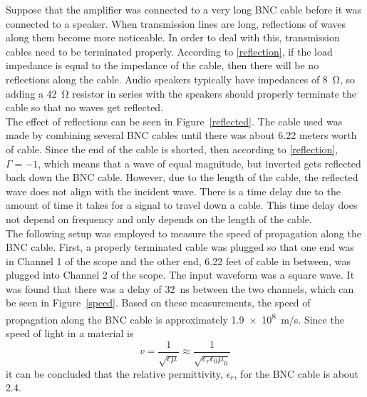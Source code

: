 \documentclass[11pt,letterpaper]{article}
\begin{document}
Suppose that the amplifier was connected to a very long BNC cable before it was
connected to a speaker. When transmission lines are long, reflections of waves
along them become more noticeable. In order to deal with this, transmission
cables need to be terminated properly. According to \eqref{reflection}, if the
load impedance is equal to the impedance of the cable, then there will be no
reflections along the cable. Audio speakers typically have impedances of 
\SI{8}{\ohm}, so adding a \SI{42}{\ohm} resistor in series with the speakers
should properly terminate the cable so that no waves get reflected.\\

The effect of reflections can be seen in Figure~\ref{reflected}. The cable used
was made by combining several BNC cables until there was about 6.22 meters worth
of cable. Since the end of the cable is shorted, then according to
\eqref{reflection}, $\Gamma = -1$, which means that a wave of equal magnitude,
but inverted gets reflected back down the BNC cable. However, due to the length
of the cable, the reflected wave does not align with the incident wave. There is
a time delay due to the amount of time it takes for a signal to travel down a
cable. This time delay does not depend on frequency and only depends on the
length of the cable.\\

The following setup was employed to measure the speed of propagation along the
BNC cable. First, a properly terminated cable was plugged so that one end was in
Channel 1 of the scope and the other end, 6.22 feet of cable in between, was
plugged into Channel 2 of the scope. The input waveform was a square wave. It
was found that there was a delay of \SI{32}{\nano\second} between the two
channels, which can be seen in Figure~\ref{speed}. Based on these measurements,
the speed of propagation along the BNC cable is approximately 
\SI{1.9e8}{\meter /\second}. Since the speed of light in a material is
\begin{equation}
    v = \frac{1}{\sqrt{\epsilon\mu}} \approx
        \frac{1}{\sqrt{\epsilon_r\epsilon_0\mu_0}}
\end{equation}
it can be concluded that the relative permittivity, $\epsilon_r$, for the BNC
cable is about 2.4.

% 
% 
\end{document}
